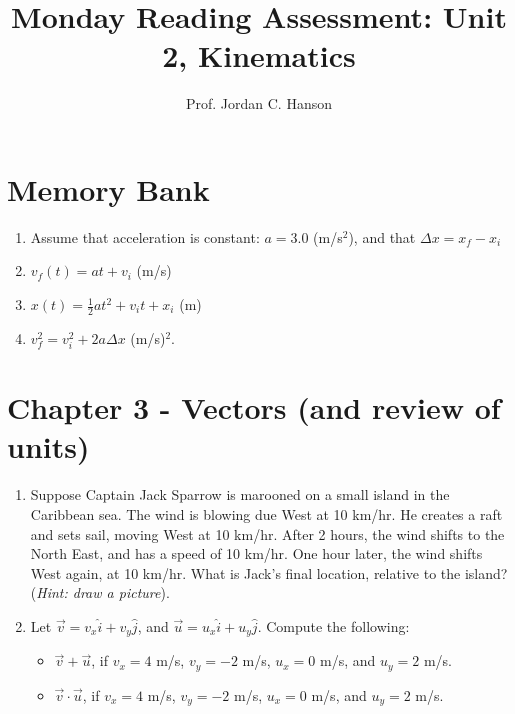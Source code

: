 \documentclass{article}
\begin{document}
\title{Monday Reading Assessment: Unit 2, Kinematics}
\author{Prof. Jordan C. Hanson}

\maketitle

\section{Memory Bank}

\begin{enumerate}
\item Assume that acceleration is constant: $a = 3.0$ (m/s$^2$), and that $\Delta x = x_f - x_i$
\item $v_f(t) = at + v_{i}$ (m/s)
\item $x(t) = \frac{1}{2}at^2 + v_{i} t + x_{i}$ (m)
\item $v_f^2 = v_i^2 + 2a\Delta x$ (m/s)$^2$.
\end{enumerate}

\section{Chapter 3 - Vectors (and review of units)}

\begin{enumerate}
\item Suppose Captain Jack Sparrow is marooned on a small island in the Caribbean sea.  The wind is blowing due West at 10 km/hr.  He creates a raft and sets sail, moving West at 10 km/hr.  After 2 hours, the wind shifts to the North East, and has a speed of 10 km/hr.  One hour later, the wind shifts West again, at 10 km/hr.  What is Jack's final location, relative to the island? (\textit{Hint: draw a picture}). \\ \vspace{3cm}
\item Let $\vec{v} = v_x \hat{i} + v_y \hat{j}$, and $\vec{u} = u_x \hat{i} + u_y \hat{j}$.  Compute the following:
\begin{itemize}
\item $\vec{v} + \vec{u}$, if $v_x = 4$ m/s, $v_y = -2$ m/s, $u_x = 0$ m/s, and $u_y = 2$ m/s.
\item $\vec{v} \cdot \vec{u}$, if $v_x = 4$ m/s, $v_y = -2$ m/s, $u_x = 0$ m/s, and $u_y = 2$ m/s.
\end{itemize}
\end{enumerate}
\end{document}
